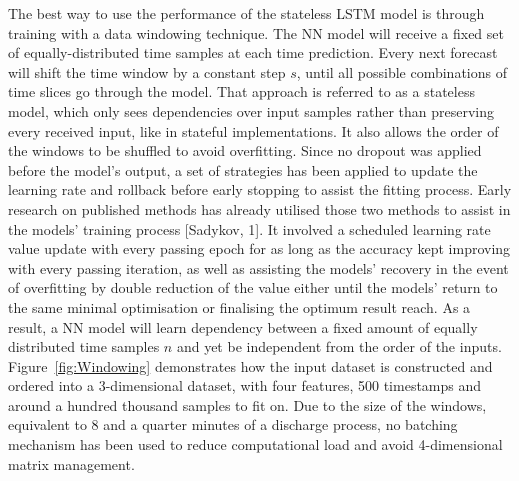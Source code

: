 %
%
The best way to use the performance of the stateless LSTM model is through training with a data windowing technique.
The NN model will receive a fixed set of equally-distributed time samples at each time prediction.
Every next forecast will shift the time window by a constant step $s$, until all possible combinations of time slices go through the model.
That approach is referred to as a stateless model, which only sees dependencies over input samples rather than preserving every received input, like in stateful implementations.
It also allows the order of the windows to be shuffled to avoid overfitting.
Since no dropout was applied before the model's output, a set of strategies has been applied to update the learning rate and rollback before early stopping to assist the fitting process.
{Early research on published methods has already utilised those two methods to assist in the models' training process [Sadykov, 1].
It involved a scheduled learning rate value update with every passing epoch for as long as the accuracy kept improving with every passing iteration, as well as assisting the models' recovery in the event of overfitting by double reduction of the value either until the models' return to the same minimal optimisation or finalising the optimum result reach.}
As a result, a NN model will learn dependency between a fixed amount of equally distributed time samples $n$ and yet be independent from the order of the inputs.
{\mbox{Figure~\ref{fig:Windowing}} demonstrates how the input dataset is constructed and ordered into a 3-dimensional dataset, with four features, 500 timestamps and around a hundred thousand samples to fit on.}
Due to the size of the windows, equivalent to 8 and a quarter minutes of a discharge process, no batching mechanism has been used to reduce computational load and avoid 4-dimensional matrix management.

